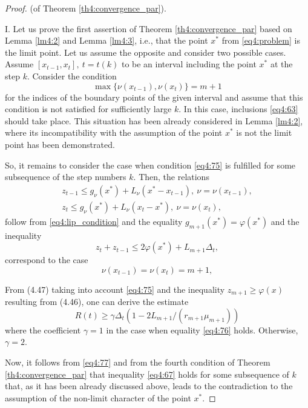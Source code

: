 \begin{proof} (of Theorem \ref{th4:convergence_par}).

  I. Let us prove the first assertion of Theorem \ref{th4:convergence_par} based on Lemma \ref{lm4:2} and Lemma \ref{lm4:3}, i.e., that the point $x^*$ from \eqref{eq4:problem} is the limit point. Let us assume the opposite and consider two  possible cases. Assume $[x_{t-1},x_t],\: t=t(k)$ to be an interval including the point $x^*$ at the step $k$. Consider the condition
  \begin{equation}
    \label{eq4:75}
    \max\{\nu(x_{t-1}),\nu(x_t)\}=m+1
  \end{equation}
  for the indices of the boundary points of the given interval and assume that this condition is not satisfied for sufficiently large $k$. In this case, inclusions \eqref{eq4:63} should take place. This situation has been already considered in Lemma \ref{lm4:2}, where its incompatibility with the assumption of the point $x^*$ is not the limit point has been demonstrated.

  So, it remains to consider the case when condition \eqref{eq4:75} is fulfilled for some subsequence of the step numbers $k$. Then, the relations
  \begin{gather}
    z_{t-1}\le g_\nu(x^*)+L_\nu(x^*-x_{t-1}),\: \nu=\nu(x_{t-1}), \nonumber \\
    z_t\le g_\nu(x^*)+L_\nu(x_t-x^*),\: \nu=\nu(x_t), \nonumber
  \end{gather}
  follow from \eqref{eq4:lip_condition} and the equality $g_{m+1}(x^*)=\varphi(x^*)$ and the inequality
  \begin{displaymath}
    z_t+z_{t-1}\le 2\varphi(x^*)+L_{m+1}\Delta_t,
  \end{displaymath}
  correspond to the case
  \begin{equation}
    \label{eq4:76}
    \nu(x_{t-1})=\nu(x_t)=m+1,
  \end{equation}

  From (4.47) taking into account \eqref{eq4:75} and the inequality $z_{m + 1}\ge \varphi(x)$ resulting from (4.46), one can derive the estimate
  \begin{equation}
    \label{eq4:77}
    R(t)\ge \gamma\Delta_t(1-2L_{m+1}/(r_{m+1}\mu_{m+1}))
  \end{equation}
  where the coefficient $\gamma=1$ in the case when equality \eqref{eq4:76} holds. Otherwise, $\gamma= 2$.

  Now, it follows from \eqref{eq4:77} and from the fourth condition of Theorem \ref{th4:convergence_par} that inequality \eqref{eq4:67} holds for some subsequence of $k$ that, as it has been already discussed above, leads to the contradiction to the assumption of the non-limit character of the point $x^*$.


\end{proof}
